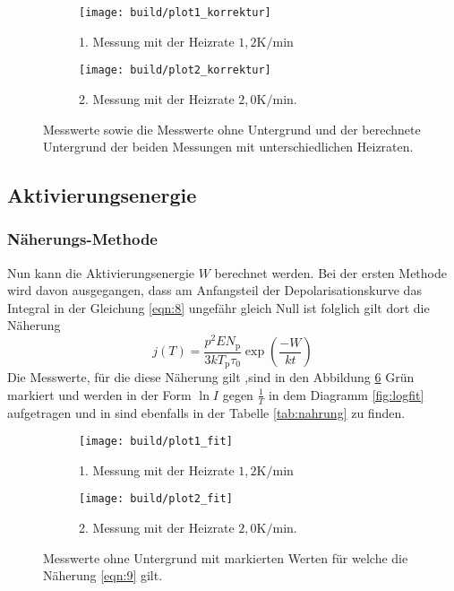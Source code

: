 \begin{figure}
  \centering
  \begin{subfigure}{0.49\textwidth}
    \centering
    \texttt{[image: build/plot1\_korrektur]}
    \caption{1. Messung mit der Heizrate $1,2 \si{\kelvin\per\minute}$}
    \label{fig:korr1}
  \end{subfigure}
  \begin{subfigure}{0.49\textwidth}
    \centering
    \texttt{[image: build/plot2\_korrektur]}
    \caption{2. Messung mit der Heizrate $2,0 \si{\kelvin\per\minute}$.}
    \label{fig:korr2}
  \end{subfigure}
\caption{Messwerte sowie die Messwerte ohne Untergrund  und der berechnete Untergrund der beiden Messungen mit unterschiedlichen Heizraten.}
\label{fig:korr}
\end{figure}


\subsection{Aktivierungsenergie}
\label{sec:Aktivierungsenergie}
\subsubsection{Näherungs-Methode}
\label{sec:naherung}
Nun kann die Aktivierungsenergie $W$ berechnet werden.
Bei der ersten Methode wird davon ausgegangen, dass am Anfangsteil
der Depolarisationskurve das Integral in der Gleichung \eqref{eqn:8}
ungefähr gleich Null ist folglich gilt dort die Näherung
\begin{equation}
j(T)=\frac{p^2EN_\mathrm{p}}{3kT_\mathrm{p}\tau_{0}}\exp\left(\frac{-W}{kt}\right) \label{eqn:9}
\end{equation}
Die Messwerte, für die diese Näherung gilt ,sind
in den Abbildung \ref{fig:fit} Grün markiert
und werden in der Form
$\ln I$ gegen $\frac{1}{T}$ in dem Diagramm
\ref{fig:logfit} aufgetragen und in sind ebenfalls in der Tabelle \ref{tab:nahrung} zu finden.




\begin{figure}
  \centering
  \begin{subfigure}{0.49\textwidth}
    \centering
    \texttt{[image: build/plot1\_fit]}
    \caption{1. Messung mit der Heizrate $1,2 \si{\kelvin\per\minute}$}
    \label{fig:fit1}
  \end{subfigure}
  \begin{subfigure}{0.49\textwidth}
    \centering
    \texttt{[image: build/plot2\_fit]}
    \caption{2. Messung mit der Heizrate $2,0 \si{\kelvin\per\minute}$.}
    \label{fig:fit2}
  \end{subfigure}
\caption{Messwerte ohne Untergrund mit markierten Werten für welche
die Näherung \ref{eqn:9} gilt.}
\label{fig:fit}
\end{figure}





